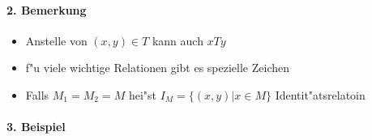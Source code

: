 \paragraph{2. Bemerkung} \parskp
\begin{itemize}
    \item Anstelle von $(x,y)\in T$ kann auch $xTy$ 
    \item f"u viele wichtige Relationen gibt es spezielle Zeichen 
    \item Falls $M_1=M_2=M$ hei"st $I_M=\{(x,y)|x\in M\}$ Identit"atsrelatoin
\end{itemize}

\paragraph{3. Beispiel}
